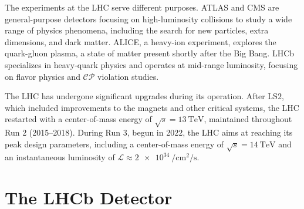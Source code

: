 The experiments at the LHC serve different purposes. ATLAS and CMS are general-purpose detectors focusing on high-luminosity collisions to study a wide range of physics phenomena, including the search for new particles, extra dimensions, and dark matter. ALICE, a heavy-ion experiment, explores the quark-gluon plasma, a state of matter present shortly after the Big Bang. LHCb specializes in heavy-quark physics and operates at mid-range luminosity, focusing on flavor physics and $\mathcal{CP}$ violation studies.

The LHC has undergone significant upgrades during its operation. After LS$2$, which included improvements to the magnets and other critical systems, the LHC restarted with a center-of-mass energy of $\sqrt{s}=\SI{13}{\tera\eV}$, maintained throughout Run 2 (2015–2018). During Run 3, begun in 2022, the LHC aims at reaching its peak design parameters, including a center-of-mass energy of $\sqrt{s}=\SI{14}{\tera\eV}$ and an instantaneous luminosity of $\mathcal{L}\approx\SI{2e34}{\per\centi\meter\squared\per\second}$.


\section{The LHCb Detector}

